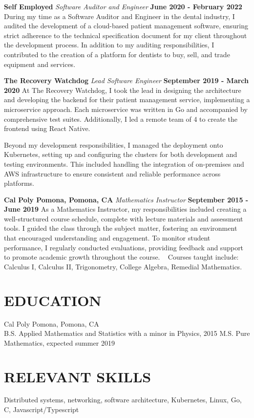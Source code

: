 \documentclass[margin]{./res}
\begin{document}
\begin{resume}
{\bf Self Employed}\newline
{\it Software Auditor and Engineer}\newline
{\bf June 2020 - February 2022}\newline
During my time as a Software Auditor and Engineer in the dental industry, I audited the development of a cloud-based patient management software, ensuring strict adherence to the technical specification document for my client throughout the development process.
In addition to my auditing responsibilities, I contributed to the creation of a platform for dentists to buy, sell, and trade equipment and services. 

{\bf The Recovery Watchdog}\newline
{\it Lead Software Engineer}\newline
{\bf September 2019 - March 2020}\newline
At The Recovery Watchdog, I took the lead in designing the architecture and developing the backend for their patient management service, implementing a microservice approach. Each microservice was written in Go and accompanied by comprehensive test suites. Additionally, I led a remote team of 4 to create the frontend using React Native.

Beyond my development responsibilities, I managed the deployment onto Kubernetes, setting up and configuring the clusters for both development and testing environments. This included handling the integration of on-premises and AWS infrastructure to ensure consistent and reliable performance across platforms.

{\bf Cal Poly Pomona, Pomona, CA}\newline
{\it Mathematics Instructor}\newline
{\bf September 2015 - June 2019}\newline
As a Mathematics Instructor, my responsibilities included creating a well-structured course schedule, complete with lecture materials and assessment tools. I guided the class through the subject matter, fostering an environment that encouraged understanding and engagement. To monitor student performance, I regularly conducted evaluations, providing feedback and support to promote academic growth throughout the course.\newline
\ \newline
Courses taught include: Calculus I, Calculus II, Trigonometry, College Algebra,
Remedial Mathematics.

\section{EDUCATION}
Cal Poly Pomona, Pomona, CA \\
B.S. Applied Mathematics and Statistics with a minor in Physics, 2015 \newline
M.S. Pure Mathematics, expected summer 2019

\section{RELEVANT SKILLS}
Distributed systems, networking, software architecture, Kubernetes, Linux, Go, C, Javascript/Typescript
 
\end{resume}
\end{document}
